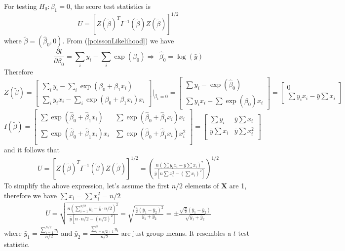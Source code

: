 \documentclass[12pt, a4paper]{article}
\begin{document}
\begin{appendix}
		
		For testing $H_0:\beta_1=0$, the score test statistics is 
		\[U = [Z(\tilde{\beta})^T I^{-1}(\tilde{\beta}) Z(\tilde{\beta})]^{1/2} \]
		where $\tilde{\beta} = (\hat{\beta}_0, 0)$.   From (\ref{poissonLikelihood}) we have
		\[\frac{\partial l}{\partial \beta_0} = \sum_i y_i - \sum_i \exp(\beta_0) \Rightarrow ~~
		\hat{\beta}_0 = \log (\bar{y})\] 
		Therefore
		\[Z(\tilde{\beta}) = \left[
		\begin{array}{c}
		\sum_i y_i - \sum_i\exp(\beta_0 + \beta_1x_i) \\
		\sum_i y_ix_i -\sum_i \exp(\beta_0 + \beta_1x_i)x_i
		\end{array}
		\right]|_{\beta_1 = 0}
		= \left[
		\begin{array}{c}
		\sum y_i - \exp(\hat{\beta}_0) \\
		\sum y_ix_i - \sum\exp(\hat{\beta}_0)x_i 
		\end{array}
		\right]
		= \left[
		\begin{array}{c}
		0\\
		\sum y_ix_i - \bar{y}\sum x_i 
		\end{array}
		\right]
		\]
		\[I(\tilde{\beta}) = 
		\left[
		\begin{array}{cc}
		\sum \exp (\hat{\beta}_0 + \hat{\beta}_1 x_i)& \sum \exp (\hat{\beta}_0 + \hat{\beta}_1
		x_i)x_i\\
		\sum \exp (\hat{\beta}_0 + \hat{\beta}_1 x_i)x_i & \sum \exp (\hat{\beta}_0 + \hat{\beta}_1
		x_i)x_i^2  \\
		\end{array}\right]
		=\left[\begin{array}{cc}
		\sum y_i  & \bar{y}\sum x_i \\
		\bar{y}\sum x_i  &\bar{y}\sum x_i^2\\
		\end{array}\right]
		\]
		and it follows that 
		\begin{align}\label{scoretest1}
			U =  [Z(\tilde{\beta})^T I^{-1}(\tilde{\beta}) Z(\tilde{\beta})]^{1/2} =\left( \frac{n(\sum
				y_ix_i -\bar{y}\sum x_i)^2}{\bar{y}[n\sum x_i^2 -(\sum x_i)^2]}\right)^{1/2}
		\end{align}
		To simplify the above expression, let's assume the first $n/2$ elements of $\bm X$ are 1,
		therefore we have $\sum x_i =\sum x_i^2=n/2$
		\begin{align}\label{scoretest2}
			U = \sqrt{\frac{n(\sum_{i=1}^{n/2}y_i-\bar{y}\cdot n/2)^2}{\bar{y}[n\cdot n/2 - (n/2)^2]}} =
			\sqrt{\frac{\frac{n}{2} (\bar{y}_1-\bar{y}_2)^2}{\bar{y}_1 + \bar{y}_2}} = \pm
			\frac{\sqrt{\frac{n}{2}}(\bar{y}_1- \bar{y}_2)}{\sqrt{\bar{y}_1 + \bar{y}_2}}
		\end{align}
		where $\bar{y}_1 = \frac{\sum_{i=1}^{n/2}y_i }{n/2}$ and $\bar{y}_2 =  \frac{\sum_{i=n/2
				+1}^{n}y_i}{n/2}$ are just group means. It resembles a $t$ test statistic.
		

\end{appendix}
\end{document}
